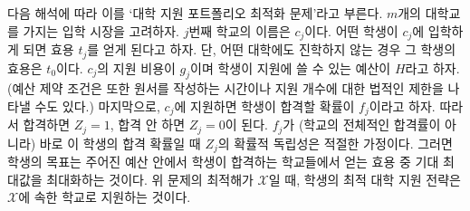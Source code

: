 \documentclass[11pt]{article} %
\newif\ifen
\theoremstyle{definition}
\theoremstyle{definition}
\begin{document}
\ifen
We refer to this problem as the \emph{optimal college application portfolio,} as follows: Consider a college market with $m$ colleges. The $j$th college is named $c_j$. Consider a single prospective student in this market, and let each $t_j$-value indicate the utility she associates with attending $c_j$, where her utility is $t_0$ if she does not attend college. Let $g_j$ denote the application fee for $c_j$ and $H$ the student's total budget to spend on application fees. (Alternatively, the budget constraint may represent the time needed to complete each application, or a legal limit on the number of applications permitted.) Lastly, let $f_j$ denote the student's probability of being admitted to $c_j$ if she applies, so that $Z_j$ equals one if she is admitted and zero if not. It is appropriate to assume that the $Z_j$ are statistically independent as long as $f_j$ are probabilities estimated specifically for this student (as opposed to generic acceptance rates). Then the student's objective is to maximize the expected utility associated with the best school she gets into within this budget. Therefore, her optimal college application strategy is given by the solution $\mathcal{X}$ to the problem above, where $\mathcal{X}$ represents the set of schools to which she applies.
\else
다음 해석에 따라 이를 `대학 지원 포트폴리오 최적화 문제'라고 부른다. $m$개의 대학교를 가지는 입학 시장을 고려하자. $j$번째 학교의 이름은 $c_j$이다. 어떤 학생이 $c_j$에 입학하게 되면 효용 $t_j$를 얻게 된다고 하자. 단, 어떤 대학에도 진학하지 않는 경우 그 학생의 효용은 $t_0$이다. $c_j$의 지원 비용이 $g_j$이며 학생이 지원에 쓸 수 있는 예산이 $H$라고 하자. (예산 제약 조건은 또한 원서를 작성하는 시간이나 지원 개수에 대한 법적인 제한을 나타낼 수도 있다.) 마지막으로, $c_j$에 지원하면 학생이 합격할 확률이 $f_j$이라고 하자. 따라서 합격하면 $Z_j = 1$, 합격 안 하면 $Z_j = 0$이 된다. $f_j$가 (학교의 전체적인 합격률이 아니라) 바로 이 학생의 합격 확률일 때 $Z_j$의 확률적 독립성은 적절한 가정이다. 그러면 학생의 목표는 주어진 예산 안에서 학생이 합격하는 학교들에서 얻는 효용 중 기대 최대값을 최대화하는 것이다. 위 문제의 최적해가 $\mathcal{X}$일 때, 학생의 최적 대학 지원 전략은 $\mathcal{X}$에  속한 학교로 지원하는 것이다.
\fi
\end{document}
